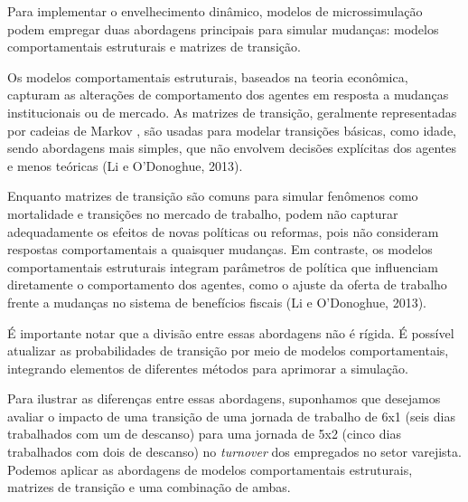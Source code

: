 \documentclass[12pt, a4paper, openany]{book}
\numberwithin{equation}{chapter}
\numberwithin{table}{chapter}
\numberwithin{figure}{chapter}
\theoremstyle{break}
\begin{document}
Para implementar o envelhecimento dinâmico, modelos de microssimulação podem empregar duas abordagens principais para simular mudanças: modelos comportamentais estruturais e matrizes de transição.

Os modelos comportamentais estruturais, baseados na teoria econômica, capturam as alterações de comportamento dos agentes em resposta a mudanças institucionais ou de mercado. As matrizes de transição, geralmente representadas por cadeias de Markov , são usadas para modelar transições básicas, como idade, sendo abordagens mais simples, que não envolvem decisões explícitas dos agentes e menos teóricas (Li e O'Donoghue, 2013).

Enquanto matrizes de transição são comuns para simular fenômenos como mortalidade e transições no mercado de trabalho, podem não capturar adequadamente os efeitos de novas políticas ou reformas, pois não consideram respostas comportamentais a quaisquer mudanças. Em contraste, os modelos comportamentais estruturais integram parâmetros de política que influenciam diretamente o comportamento dos agentes, como o ajuste da oferta de trabalho frente a mudanças no sistema de benefícios fiscais (Li e O'Donoghue, 2013).

É importante notar que a divisão entre essas abordagens não é rígida. É possível atualizar as probabilidades de transição por meio de modelos comportamentais, integrando elementos de diferentes métodos para aprimorar a simulação.

Para ilustrar as diferenças entre essas abordagens, suponhamos que desejamos avaliar o impacto de uma transição de uma jornada de trabalho de 6x1 (seis dias trabalhados com um de descanso) para uma jornada de 5x2 (cinco dias trabalhados com dois de descanso) no \textit{turnover} dos empregados no setor varejista. Podemos aplicar as abordagens de modelos comportamentais estruturais, matrizes de transição e uma combinação de ambas.
\end{document}
